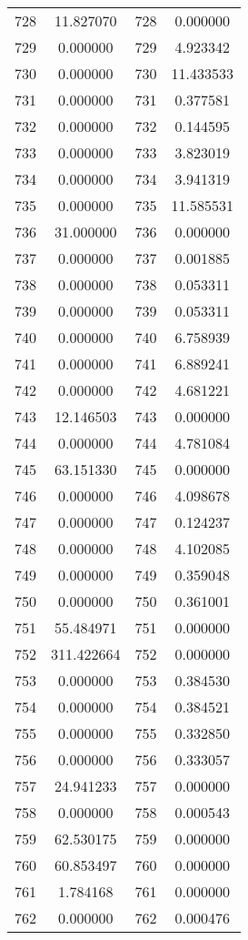 \documentclass[12pt]{article}
\begin{document}
\begin{longtable}{@{}cccc@{}}
728 & 11.827070 & 728 & 0.000000 \\
729 & 0.000000 & 729 & 4.923342 \\
730 & 0.000000 & 730 & 11.433533 \\
731 & 0.000000 & 731 & 0.377581 \\
732 & 0.000000 & 732 & 0.144595 \\
733 & 0.000000 & 733 & 3.823019 \\
734 & 0.000000 & 734 & 3.941319 \\
735 & 0.000000 & 735 & 11.585531 \\
736 & 31.000000 & 736 & 0.000000 \\
737 & 0.000000 & 737 & 0.001885 \\
738 & 0.000000 & 738 & 0.053311 \\
739 & 0.000000 & 739 & 0.053311 \\
740 & 0.000000 & 740 & 6.758939 \\
741 & 0.000000 & 741 & 6.889241 \\
742 & 0.000000 & 742 & 4.681221 \\
743 & 12.146503 & 743 & 0.000000 \\
744 & 0.000000 & 744 & 4.781084 \\
745 & 63.151330 & 745 & 0.000000 \\
746 & 0.000000 & 746 & 4.098678 \\
747 & 0.000000 & 747 & 0.124237 \\
748 & 0.000000 & 748 & 4.102085 \\
749 & 0.000000 & 749 & 0.359048 \\
750 & 0.000000 & 750 & 0.361001 \\
751 & 55.484971 & 751 & 0.000000 \\
752 & 311.422664 & 752 & 0.000000 \\
753 & 0.000000 & 753 & 0.384530 \\
754 & 0.000000 & 754 & 0.384521 \\
755 & 0.000000 & 755 & 0.332850 \\
756 & 0.000000 & 756 & 0.333057 \\
757 & 24.941233 & 757 & 0.000000 \\
758 & 0.000000 & 758 & 0.000543 \\
759 & 62.530175 & 759 & 0.000000 \\
760 & 60.853497 & 760 & 0.000000 \\
761 & 1.784168 & 761 & 0.000000 \\
762 & 0.000000 & 762 & 0.000476 \\

\end{longtable}
\end{document}

